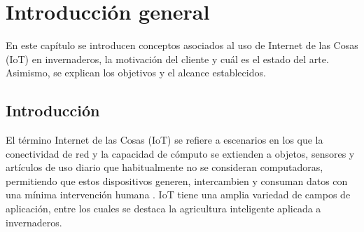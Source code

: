 \chapter{Introducción general} %

\label{Chapter1} %
\label{IntroGeneral}


\newcommand{\keyword}[1]{\textbf{#1}}
\newcommand{\tabhead}[1]{\textbf{#1}}
\newcommand{\code}[1]{\texttt{#1}}
\newcommand{\file}[1]{\texttt{\bfseries#1}}
\newcommand{\option}[1]{\texttt{\itshape#1}}
\newcommand{\grados}{$^{\circ}$}


En este capítulo se introducen conceptos asociados al uso de Internet de las Cosas (IoT) en invernaderos, la motivación del cliente y cuál es el estado del arte. Asimismo, se explican los objetivos y el alcance establecidos.
\section{Introducción}
\label{Introducción}



El término Internet de las Cosas (IoT) se refiere a escenarios en los que la conectividad de red y la capacidad de cómputo se extienden a objetos, sensores y artículos de uso diario que habitualmente no se consideran computadoras, permitiendo que estos dispositivos generen, intercambien y consuman datos con una mínima intervención humana \citep{iotOverview}.
IoT tiene una amplia variedad de campos de aplicación, entre los cuales se destaca la agricultura inteligente aplicada a invernaderos.

